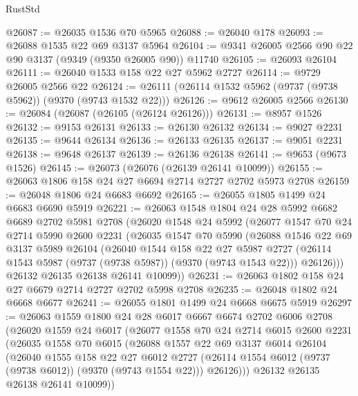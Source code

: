\begin{lexlean}{RustStd}
\begin{coremodule}
{\begin{coremodule}
{{{{{{{{{{{{{{{{{{{{{{{{{{{{{{{{{{{{{{{@26087 := @26035 @1536 @70 @5965
@26088 := @26040 @178
@26093 := @26088 @1535 @22 @69 @3137 @5964
@26104 := @9341 @26005 @2566 @90 @22 @90 @3137 (@9349 (@9350 @26005 @90)) @11740
@26105 := @26093 @26104
@26111 := @26040 @1533 @158 @22 @27 @5962 @2727
@26114 := @9729 @26005 @2566 @22
@26124 := @26111 (@26114 @1532 @5962 (@9737 (@9738 @5962)) (@9370 (@9743 @1532 @22)))
@26126 := @9612 @26005 @2566
@26130 := @26084 (@26087 (@26105 (@26124 @26126)))
@26131 := @8957 @1526
@26132 := @9153 @26131
@26133 := @26130 @26132
@26134 := @9027 @2231
@26135 := @9644 @26134
@26136 := @26133 @26135
@26137 := @9051 @2231
@26138 := @9648 @26137
@26139 := @26136 @26138
@26141 := @9653 (@9673 @1526)
@26145 := @26073 (@26076 (@26139 @26141 @10099))
@26155 := @26063 @1806 @158 @24 @27 @6694 @2714 @2727 @2702 @5973 @2708
@26159 := @26048 @1806 @24 @6683 @6692
@26165 := @26055 @1805 @1499 @24 @6683 @6690 @5919
@26221 := @26063
    @1548
    @1804
    @24
    @28
    @5992
    @6682
    @6689
    @2702
    @5981
    @2708
    (@26020
      @1548
      @24
      @5992
      (@26077
        @1547
        @70
        @24
        @2714
        @5990
        @2600
        @2231
        (@26035
          @1547
          @70
          @5990
          (@26088
            @1546
            @22
            @69
            @3137
            @5989
            @26104
            (@26040
              @1544
              @158
              @22
              @27
              @5987
              @2727
              (@26114 @1543 @5987 (@9737 (@9738 @5987)) (@9370 (@9743 @1543 @22)))
              @26126)))
        @26132
        @26135
        @26138
        @26141
        @10099))
@26231 := @26063 @1802 @158 @24 @27 @6679 @2714 @2727 @2702 @5998 @2708
@26235 := @26048 @1802 @24 @6668 @6677
@26241 := @26055 @1801 @1499 @24 @6668 @6675 @5919
@26297 := @26063
    @1559
    @1800
    @24
    @28
    @6017
    @6667
    @6674
    @2702
    @6006
    @2708
    (@26020
      @1559
      @24
      @6017
      (@26077
        @1558
        @70
        @24
        @2714
        @6015
        @2600
        @2231
        (@26035
          @1558
          @70
          @6015
          (@26088
            @1557
            @22
            @69
            @3137
            @6014
            @26104
            (@26040
              @1555
              @158
              @22
              @27
              @6012
              @2727
              (@26114 @1554 @6012 (@9737 (@9738 @6012)) (@9370 (@9743 @1554 @22)))
              @26126)))
        @26132
        @26135
        @26138
        @26141
        @10099))
}}}}}}}}}}}}}}}}}}}}}}}}}}}}}}}}}}}}}}}
\end{coremodule}}
\end{coremodule}
\end{lexlean}
